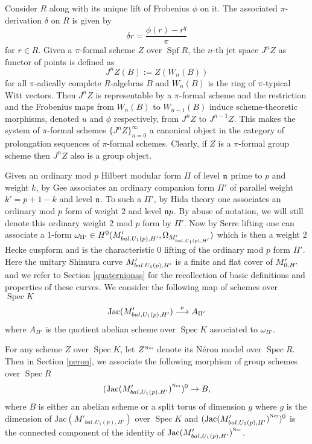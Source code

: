 \documentclass{amsart}
\newcommand{\n}{\mfrak{n}}
\numberwithin{equation}{section}
\def \mb{\mbox}
\newcommand{\Cs}{M'_{bal,U_1(p),H'}}
\newcommand{\Jac}{\mb{Jac}(\Cs)}
\DeclareMathOperator{\Spec}{\mathrm{Spec}}
\DeclareMathOperator{\Spf}{\mathrm{Spf}}
\def \d{\delta}
\begin{document}
Consider $R$ along with its unique lift of Frobenius $\phi$ on it. The 
associated $\pi$-derivation $\d$ on $R$ is given by
$$
\d r = \frac{\phi(r) - r^q}{\pi}
$$
for $r \in R$. Given  a $\pi$-formal scheme $Z$ over $\Spf R$, the $n$-th jet 
space $J^nZ$ as functor of points is defined as
$$
J^nZ(B) := Z(W_n(B))
$$
for all $\pi$-adically complete $R$-algebras $B$ and $W_n(B)$ is the ring of 
$\pi$-typical
Witt vectors. Then $J^nZ$ is representable by a $\pi$-formal scheme and the 
restriction and the Frobenius maps from $W_n(B)$ to $W_{n-1}(B)$ induce
scheme-theoretic morphisms, denoted $u$ and $\phi$ respectively, from
$J^nZ$ to $J^{n-1}Z$. This makes the system of $\pi$-formal schemes $\{J^nZ
\}_{n=0}^\infty$ a canonical object in the category of prolongation sequences 
of $\pi$-formal schemes. Clearly, if $Z$ is a $\pi$-formal group scheme then 
$J^nZ$ also is a group object.


Given an ordinary
 mod $p$ Hilbert modular form $\Pi$ of level $\n$ prime to $p$ and weight $k$, 
by \cite{MR2357747} Gee associates an ordinary companion form $\Pi'$ of 
parallel weight 
$k'= p+1 -k$ and level $\n$. To such a $\Pi'$, by Hida theory one associates 
an ordinary mod 
$p$ form of weight $2$ and level $\n p$. By abuse of notation, we will still
denote this ordinary weight 2 mod $p$ form by $\Pi'$. Now by Serre lifting one 
can associate a 1-form $\omega_{\Pi'} \in H^0(M'_{bal.U_1(p),H'},\Omega_{M'_{bal.U_1(p),H'}})$ which is
then a weight 2 Hecke cuspform and is the characteristic 0 lifting of the 
ordinary mod $p$ form $\Pi'$. Here the unitary Shimura curve $M'_{bal.U_1(p),H'}$ is a finite
and flat cover of $M'_{0,H'}$ and we refer to Section \ref{quaternionas} for 
the recollection of basic definitions and properties of these curves. 
We consider the following map of schemes over $\Spec K$ 
\begin{equation}
\label{abeljacobi}
\Jac \stk{\nu}{\longrightarrow} A_{\Pi'}
\end{equation}
where $A_{\Pi'}$ is the quotient abelian scheme over $\Spec K$
associated to $\omega_{\Pi'}$. 

For any scheme $Z$ over $\Spec K$, let $\Ner{Z}$ denote its N\'{e}ron model
over $\Spec R$. Then in Section \ref{neron}, we associate the following 
morphism of group schemes over $\Spec R$
\begin{equation}
\label{abeljacobineron}
(\Ner{\Jac})^0 \map B,
\end{equation}
where $B$ is either an abelian scheme or a split torus of dimension $g$ where
$g$ is the dimension of $\Jac$ over $\Spec K$ and $(\Ner{\Jac})^0$ is the
connected component of the identity of $\Ner{\Jac}$.
\end{document}
